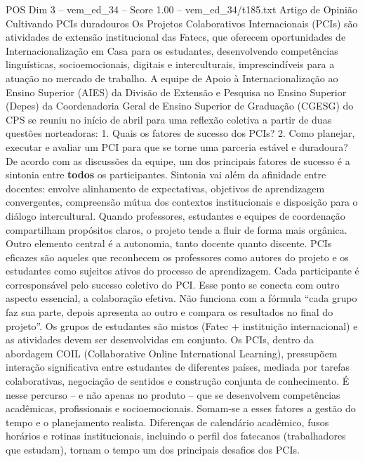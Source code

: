 \begin{textsample}{POS Dim 3 – vem\_ed\_34 – Score 1.00 – vem\_ed\_34/t185.txt}  \label{ex:f3_pos_055}
Artigo de Opinião Cultivando PCIs duradouros Os Projetos Colaborativos Internacionais (PCIs) são atividades de extensão institucional das Fatecs, que oferecem oportunidades de Internacionalização em Casa para os estudantes, desenvolvendo competências linguísticas, socioemocionais, digitais e interculturais, imprescindíveis para a atuação no mercado de trabalho.
A equipe de Apoio à Internacionalização ao Ensino Superior (AIES) da Divisão de Extensão e Pesquisa no Ensino Superior (Depes) da Coordenadoria Geral de Ensino Superior de Graduação (CGESG) do CPS se reuniu no início de abril para uma reflexão coletiva a partir de duas questões norteadoras: 1.
Quais os fatores de sucesso dos PCIs? 2.
Como planejar, executar e avaliar um PCI para que se torne uma parceria estável e duradoura?
De acordo com as discussões da equipe, um dos principais fatores de sucesso é a sintonia entre \textbf{todos} os participantes.
Sintonia vai além da afinidade entre docentes: envolve alinhamento de expectativas, objetivos de aprendizagem convergentes, compreensão mútua dos contextos institucionais e disposição para o diálogo intercultural.
Quando professores, estudantes e equipes de coordenação compartilham propósitos claros, o projeto tende a fluir de forma mais orgânica.
Outro elemento central é a autonomia, tanto docente quanto discente.
PCIs eficazes são aqueles que reconhecem os professores como autores do projeto e os estudantes como sujeitos ativos do processo de aprendizagem.
Cada participante é corresponsável pelo sucesso coletivo do PCI.
Esse ponto se conecta com outro aspecto essencial, a colaboração efetiva.
Não funciona com a fórmula “cada grupo faz sua parte, depois apresenta ao outro e compara os resultados no final do projeto”.
Os grupos de estudantes são mistos (Fatec + instituição internacional) e as atividades devem ser desenvolvidas em conjunto.
Os PCIs, dentro da abordagem COIL (Collaborative Online International Learning), pressupõem interação significativa entre estudantes de diferentes países, mediada por tarefas colaborativas, negociação de sentidos e construção conjunta de conhecimento.
É nesse percurso – e não apenas no produto – que se desenvolvem competências acadêmicas, profissionais e socioemocionais.
Somam-se a esses fatores a gestão do tempo e o planejamento realista.
Diferenças de calendário acadêmico, fusos horários e rotinas institucionais, incluindo o perfil dos fatecanos (trabalhadores que estudam), tornam o tempo um dos principais desafios dos PCIs.

\end{textsample}
